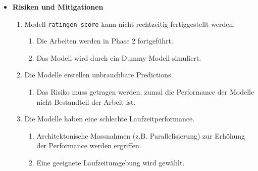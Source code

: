 \begin{itemize}
\begin{enumerate}
\begin{multicols}{2}
\begin{enumerate}
                        \item Dokumentation
                    \end{enumerate}
                \end{multicols}
            \item Modell \texttt{ratingen\_score}
                \begin{multicols}{2}
                    \begin{enumerate}
                        \item Modelldaten
                        \item Laufzeitumgebung
                        \item Code für Prediction
                        \item Dokumentation
                    \end{enumerate}
                \end{multicols}
            \item Planung der zweiten Phase
        \end{enumerate}
    \item \textbf{Risiken und Mitigationen}
        \begin{enumerate}
            \item Modell \texttt{ratingen\_score} kann nicht rechtzeitig fertiggestellt werden.
                \begin{enumerate}
                    \item Die Arbeiten werden in Phase 2 fortgeführt.
                    \item Das Modell wird durch ein Dummy-Modell simuliert.
                \end{enumerate}
            \item Die Modelle erstellen unbrauchbare Predictions.
                \begin{enumerate}
                    \item Das Risiko muss getragen werden, zumal die Performance der Modelle nicht Bestandteil der Arbeit ist.
                \end{enumerate}
            \item Die Modelle haben eine schlechte Laufzeitperformance.
                \begin{enumerate}
                    \item Architektonische Massnahmen (z.B. Parallelisierung) zur Erhöhung der Performance werden ergriffen.
                    \item Eine geeignete Laufzeitumgebung wird gewählt.
                \end{enumerate}
        \end{enumerate}
\end{itemize}

